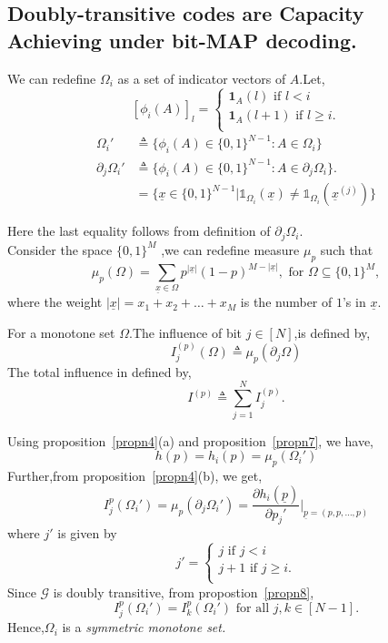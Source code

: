 \documentclass[
10pt, %
a4paper, %
oneside, %
headinclude,footinclude, %
BCOR5mm, %
]{scrartcl}
\begin{document}
\subsection*{Doubly-transitive codes are Capacity Achieving under bit-MAP decoding. }
\begin{definition}
We can redefine $\Omega_i$ as a set of indicator vectors of $A$.Let,
\[
    [\phi_i(A)]_l=\left\{
                \begin{array}{ll}
                  \mathbf{1}_A(l) \text{ if } l < i\\
                  \mathbf{1}_A(l+1) \text{ if } l \ge i.\\
                \end{array}
              \right.
  \]
\begin{align*}
\Omega_i' &\triangleq \{\phi_i(A) \in \{0,1\}^{N-1} : A \in \Omega_i\}\\
\partial_j\Omega_i' &\triangleq \{\phi_i(A) \in \{0,1\}^{N-1}: A \in \partial_j\Omega_i\}.\\& =\{\underline{x} \in \{0,1\}^{N-1} | \mathbb{1}_{\Omega_i}(\underline{x}) \neq  \mathbb{1}_{\Omega_i}(\underline{x}^{(j)})\}
\end{align*}
\label{defn13}
\end{definition}
Here the last equality follows from definition of $\partial_j\Omega_i$.\\
Consider the space $\{0,1\}^M$ ,we can redefine measure $\mu_p$ such that $$\mu_p(\Omega) = \sum_{\underline{x} \in \Omega} p^{|\underline{x}|}(1-p)^{M-|\underline{x}|}, \text{ for }\Omega \subseteq \{0,1\}^M,$$ where the weight $|\underline{x}| = x_1 + x_2 + \ldots + x_M$ is the number of $1$'s in $\underline{x}$. 
\begin{definition}
For a monotone set $\Omega$.The influence of bit $j \in [N]$,is defined by,
$$I_j^{(p)}(\Omega)\triangleq \mu_p(\partial_j\Omega)$$
The total influence in defined by,
$$I^{(p)}\triangleq \sum^N_{j=1}I_j^{(p)}.$$
\label{defn15}
\end{definition}
Using proposition~\ref{propn4}(a) and proposition~\ref{propn7}, we have, 
$$h(p)=h_i(p)=\mu_p(\Omega_i')$$
Further,from proposition~\ref{propn4}(b), we get,
$$I_j^{p}(\Omega_i')=\mu_p(\partial_j\Omega_i') = \frac{\partial h_i(\underline{p})}{\partial p_j'}\Bigg|_{\underline{p}=(p,p,\ldots,p)}$$
where $j'$ is given by 
\[
    j'=\left\{
                \begin{array}{ll}
                  j \text{ if } j < i\\
                  j+1 \text{ if } j \ge i.\\
                \end{array}
              \right.
  \]
Since $\mathcal{G}$ is doubly transitive, from propostion~\ref{propn8}, $$I_j^{p}(\Omega_i') = I_k^{p}(\Omega_i') \text{ for all } j,k \in [N-1].$$
Hence,$\Omega_i$ is a \emph{symmetric monotone set.}
\end{document}
